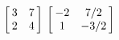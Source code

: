 {$\left[\hskip -3pt \begin{array}{cc} 3&7\\  2&4\end {array} \hskip -3pt
 \right] $
 }
{$\left[\hskip -3pt \begin{array}{cc} -2&7/2\\  1&-3/2\end {array} \hskip -3pt
 \right] $}
